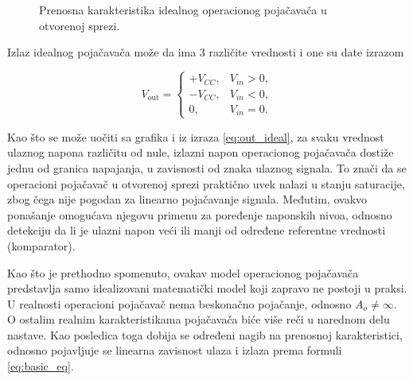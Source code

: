 \begin{figure}[H]
    \centering
    \caption{Prenosna karakteristika idealnog operacionog pojačavača u otvorenoj sprezi.}
    \label{fig:opamp_transfer}
\end{figure}

{Izlaz idealnog pojačavača može da ima 3 različite vrednosti i one su date izrazom}

\begin{equation}
    V_{\mathrm{out}} =
    \begin{cases}
        +V_{CC}, & V_{in} > 0, \\
        -V_{CC}, & V_{in} < 0, \\
        0,       & V_{in} = 0.
    \end{cases}
    \label{eq:out_ideal}
\end{equation}

{Kao što se može uočiti sa grafika i iz izraza \ref{eq:out_ideal}, za svaku vrednost ulaznog napona različitu od nule, izlazni napon operacionog pojačavača dostiže jednu od granica napajanja, u zavisnosti od znaka ulaznog signala. To znači da se operacioni pojačavač u otvorenoj sprezi praktično uvek nalazi u stanju saturacije, zbog čega nije pogodan za linearno pojačavanje signala. Međutim, ovakvo ponašanje omogućava njegovu primenu za poređenje naponskih nivoa, odnosno detekciju da li je ulazni napon veći ili manji od određene referentne vrednosti (komparator).}

{Kao što je prethodno spomenuto, ovakav model operacionog pojačavača predstavlja samo idealizovani matematički model koji zapravo ne postoji u praksi. U realnosti operacioni pojačavač nema beskonačno pojačanje, odnosno $A_o \ne \infty$. O ostalim realnim karakteristikama pojačavača biće više reči u narednom delu nastave. Kao posledica toga dobija se određeni nagib na prenosnoj karakteristici, odnosno pojavljuje se linearna zavisnost ulaza i izlaza prema formuli \ref{eq:basic_eq}.}

